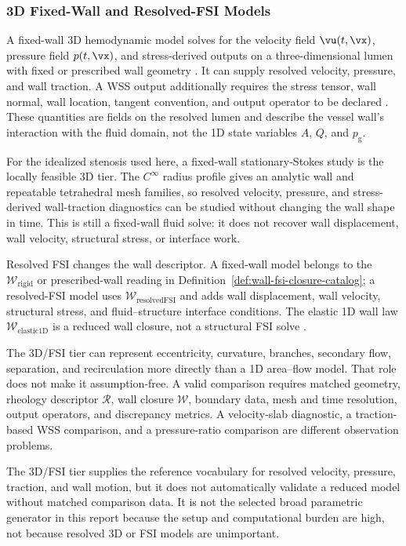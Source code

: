 \subsubsection{3D Fixed-Wall and Resolved-FSI Models}
\label{subsubsec:3d-models}

A fixed-wall 3D hemodynamic model solves for the velocity field
$\vu(t,\vx)$, pressure field $p(t,\vx)$, and stress-derived outputs on a
three-dimensional lumen with fixed or prescribed wall geometry
\cite{QuarteroniFormaggia2004CardiovascularModeling}. It can supply resolved
velocity, pressure, and wall traction. A WSS output additionally requires the
stress tensor, wall normal, wall location, tangent convention, and output
operator to be declared
\cite{JohnEtAl2017WallShearStressVectorForm}. These quantities are fields on
the resolved lumen and describe the vessel wall's interaction with the fluid
domain, not the 1D state variables $A$, $Q$, and $p_{\mathrm g}$.

For the idealized stenosis used here, a fixed-wall stationary-Stokes study is
the locally feasible 3D tier. The $C^\infty$ radius profile gives an analytic
wall and repeatable tetrahedral mesh families, so resolved velocity, pressure,
and stress-derived wall-traction diagnostics can be studied without changing
the wall shape in time. This is still a fixed-wall fluid solve: it does not
recover wall displacement, wall velocity, structural stress, or interface work.

Resolved FSI changes the wall descriptor. A fixed-wall model belongs to the
$\mathcal W_{\mathrm{rigid}}$ or prescribed-wall reading in
Definition~\ref{def:wall-fsi-closure-catalog}; a resolved-FSI model uses
$\mathcal W_{\mathrm{resolvedFSI}}$ and adds wall displacement, wall velocity,
structural stress, and fluid--structure interface conditions. The elastic 1D
wall law $\mathcal W_{\mathrm{elastic1D}}$ is a reduced wall closure, not a
structural FSI solve
\cite{FormaggiaEtAl2007FSICoupling}.

The 3D/FSI tier can represent eccentricity, curvature, branches, secondary
flow, separation, and recirculation more directly than a 1D area--flow model.
That role does not make it assumption-free. A valid comparison requires matched
geometry, rheology descriptor $\mathcal R$, wall closure $\mathcal W$, boundary
data, mesh and time resolution, output operators, and discrepancy metrics. A
velocity-slab diagnostic, a traction-based WSS comparison, and a pressure-ratio
comparison are different observation problems.

The 3D/FSI tier supplies the reference vocabulary for resolved velocity,
pressure, traction, and wall motion, but it does not automatically validate a
reduced model without matched comparison data. It is not the selected broad
parametric generator in this report because the setup and computational burden
are high, not because resolved 3D or FSI models are unimportant.
